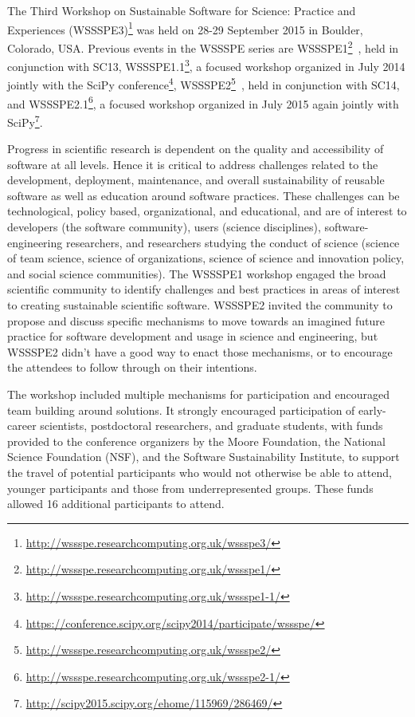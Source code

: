 \documentclass[11pt, oneside]{amsart}
\newcommand{\katznote}[1]{ {\textcolor{magenta}    { ***Dan:      #1 }}}
\newcommand{\gabnote}[1]{ {\textcolor{cyan}    { ***Gabrielle:     #1 }}}
\newcommand{\nchnote}[1]{  {\textcolor{orange}      { ***Neil: #1 }}}
\newcommand{\manishnote}[1]{  {\textcolor{violet}     { ***Manish: #1 }}}
\newcommand{\davidnote}[1]{  {\textcolor{darkgreen}      { ***David: #1 }}}
\begin{document}
%
%
%
%

The Third Workshop on Sustainable Software for Science: Practice and Experiences
(WSSSPE3)\footnote{\url{http://wssspe.researchcomputing.org.uk/wssspe3/}} was
held on 28-29 September 2015 in Boulder, Colorado, USA. Previous events in the
WSSSPE series are
WSSSPE1\footnote{\url{http://wssspe.researchcomputing.org.uk/wssspe1/}}~\cite{WSSSPE1-pre-report,WSSSPE1},
held in conjunction with SC13,
WSSSPE1.1\footnote{\url{http://wssspe.researchcomputing.org.uk/wssspe1-1/}}, a
focused workshop organized in July 2014 jointly with the SciPy
conference\footnote{\url{https://conference.scipy.org/scipy2014/participate/wssspe/}},
WSSSPE2\footnote{\url{http://wssspe.researchcomputing.org.uk/wssspe2/}}~\cite{WSSSPE2-pre-report,WSSSPE2},
held in conjunction with SC14, and
WSSSPE2.1\footnote{\url{http://wssspe.researchcomputing.org.uk/wssspe2-1/}}, a
focused workshop organized in July 2015 again jointly with
SciPy\footnote{\url{http://scipy2015.scipy.org/ehome/115969/286469/}}.

Progress in scientific research is dependent on the quality and accessibility of
software at all levels. Hence it is critical to address challenges related to
the development, deployment, maintenance, and overall sustainability of reusable
software as well as education around software practices. These challenges can be
technological, policy based, organizational, and educational, and are of
interest to developers (the software community), users (science disciplines),
software-engineering researchers, and researchers studying the conduct of
science (science of team science, science of organizations, science of science
and innovation policy, and social science communities). The WSSSPE1 workshop
engaged the broad scientific community to identify challenges and best practices
in areas of interest to creating sustainable scientific software. WSSSPE2
invited the community to propose and discuss specific mechanisms to move towards
an imagined future practice for software development and usage in science and
engineering, but WSSSPE2 didn't have a good way to enact those mechanisms, or to
encourage the attendees to follow through on their intentions.

The workshop included multiple mechanisms for participation and encouraged team
building around solutions. It strongly encouraged participation of early-career
scientists, postdoctoral researchers, and graduate students, with funds provided
to the conference organizers by the Moore Foundation, the National Science
Foundation (NSF), and the Software Sustainability Institute, to support the
travel of potential participants who would not otherwise be able to attend,
younger participants and those from underrepresented groups. These funds allowed
16 additional participants to attend.
\end{document}
